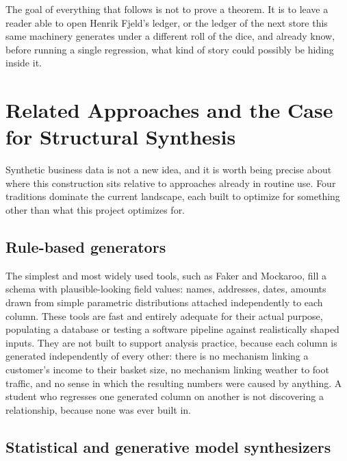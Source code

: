 \documentclass[12pt,a4paper]{article}
\begin{document}
The goal of everything that follows is not to prove a theorem. It is to
leave a reader able to open Henrik Fjeld's ledger, or the ledger of the
next store this same machinery generates under a different roll of the
dice, and already know, before running a single regression, what kind
of story could possibly be hiding inside it.

\section{Related Approaches and the Case for Structural Synthesis}
\label{sec:literature}

Synthetic business data is not a new idea, and it is worth being precise
about where this construction sits relative to approaches already in
routine use. Four traditions dominate the current landscape, each built
to optimize for something other than what this project optimizes for.

\subsection{Rule-based generators}

The simplest and most widely used tools, such as Faker and Mockaroo, fill
a schema with plausible-looking field values: names, addresses, dates,
amounts drawn from simple parametric distributions attached
independently to each column. These tools are fast and entirely adequate
for their actual purpose, populating a database or testing a software
pipeline against realistically shaped inputs. They are not built to
support analysis practice, because each column is generated independently
of every other: there is no mechanism linking a customer's income to
their basket size, no mechanism linking weather to foot traffic, and no
sense in which the resulting numbers were caused by anything. A student
who regresses one generated column on another is not discovering a
relationship, because none was ever built in.

\subsection{Statistical and generative model synthesizers}
\end{document}
